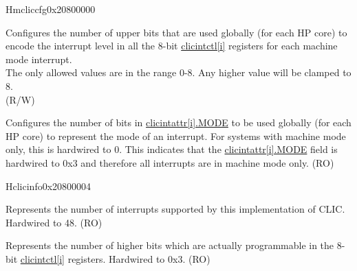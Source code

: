 \begin{register}{H}{{mcliccfg}}{0x20800000}\label{regdesc:MCLICCFG_REG}
%
%
%
%
\regnewline%
\begin{regdesc}
\begin{reglist}
\label{fielddesc:MCLICCFG_MNLBITS}\item [MNLBITS] Configures the number of upper bits that are used globally (for each HP core) to encode the interrupt level in all the 8-bit \hyperref[regdesc:MCLICINTCTL_REG_i]{clicintctl[i]} registers for each machine mode interrupt.\\
The only allowed values are in the range 0-8. Any higher value will be clamped to 8. \\
(R/W)
\label{fielddesc:MCLICCFG_NMBITS}\item [NMBITS] Configures the number of bits in \hyperref[fielddesc:MCLICINTATTR_i_MODE]{clicintattr[i].MODE} to be used globally (for each HP core) to represent the mode of an interrupt. For systems with machine mode only, this is hardwired to 0. This indicates that the \hyperref[fielddesc:MCLICINTATTR_i_MODE]{clicintattr[i].MODE} field is hardwired to 0x3 and therefore all interrupts are in machine mode only. (RO) \\
\end{reglist}
\end{regdesc}
\end{register}

\begin{register}{H}{{clicinfo}}{0x20800004}\label{regdesc:CLICINFO_REG}
%
%
%
%
\regnewline%
\begin{regdesc}
\begin{reglist}
\label{fielddesc:CLICINFO_NUM_INTERRUPTS}\item [NUM\_INTERRUPTS] Represents the number of interrupts supported by this implementation of CLIC. Hardwired to 48. (RO)
\label{fielddesc:CLICINFO_CLICINTCTLBITS}\item [CLICINTCTLBITS] Represents the number of higher bits which are actually programmable in the 8-bit \hyperref[regdesc:MCLICINTCTL_REG_i]{clicintctl[i]} registers. Hardwired to 0x3. (RO)
\end{reglist}
\end{regdesc}
\end{register}


